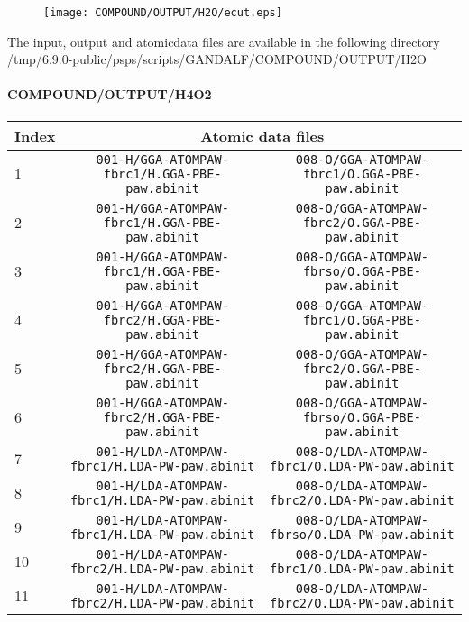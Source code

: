 \documentclass[onecolumn]{revtex4}
\begin{document}
\begin{figure}[h] 
\centering 
\texttt{[image: COMPOUND/OUTPUT/H2O/ecut.eps]}
\end{figure}
\begin{htmlonly} 
The input, output and atomicdata files are available in the following directory 
  {/tmp/6.9.0-public/psps/scripts/GANDALF/COMPOUND/OUTPUT/H2O} 
\end{htmlonly} 
\newpage
\paragraph*{\bf{COMPOUND/OUTPUT/H4O2}}
\begin{center}
\begin{tabular}{lcc}
\hline
Index & \multicolumn{2}{c}{Atomic data files} \\
\hline
1 & \verb?001-H/GGA-ATOMPAW-fbrc1/H.GGA-PBE-paw.abinit? & \verb?008-O/GGA-ATOMPAW-fbrc1/O.GGA-PBE-paw.abinit? \\
2 & \verb?001-H/GGA-ATOMPAW-fbrc1/H.GGA-PBE-paw.abinit? & \verb?008-O/GGA-ATOMPAW-fbrc2/O.GGA-PBE-paw.abinit? \\
3 & \verb?001-H/GGA-ATOMPAW-fbrc1/H.GGA-PBE-paw.abinit? & \verb?008-O/GGA-ATOMPAW-fbrso/O.GGA-PBE-paw.abinit? \\
4 & \verb?001-H/GGA-ATOMPAW-fbrc2/H.GGA-PBE-paw.abinit? & \verb?008-O/GGA-ATOMPAW-fbrc1/O.GGA-PBE-paw.abinit? \\
5 & \verb?001-H/GGA-ATOMPAW-fbrc2/H.GGA-PBE-paw.abinit? & \verb?008-O/GGA-ATOMPAW-fbrc2/O.GGA-PBE-paw.abinit? \\
6 & \verb?001-H/GGA-ATOMPAW-fbrc2/H.GGA-PBE-paw.abinit? & \verb?008-O/GGA-ATOMPAW-fbrso/O.GGA-PBE-paw.abinit? \\
7 & \verb?001-H/LDA-ATOMPAW-fbrc1/H.LDA-PW-paw.abinit? & \verb?008-O/LDA-ATOMPAW-fbrc1/O.LDA-PW-paw.abinit? \\
8 & \verb?001-H/LDA-ATOMPAW-fbrc1/H.LDA-PW-paw.abinit? & \verb?008-O/LDA-ATOMPAW-fbrc2/O.LDA-PW-paw.abinit? \\
9 & \verb?001-H/LDA-ATOMPAW-fbrc1/H.LDA-PW-paw.abinit? & \verb?008-O/LDA-ATOMPAW-fbrso/O.LDA-PW-paw.abinit? \\
10 & \verb?001-H/LDA-ATOMPAW-fbrc2/H.LDA-PW-paw.abinit? & \verb?008-O/LDA-ATOMPAW-fbrc1/O.LDA-PW-paw.abinit? \\
11 & \verb?001-H/LDA-ATOMPAW-fbrc2/H.LDA-PW-paw.abinit? & \verb?008-O/LDA-ATOMPAW-fbrc2/O.LDA-PW-paw.abinit? \\

\end{tabular}
\end{center}
\end{document}

